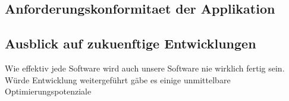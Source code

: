 \documentclass[../main.tex]{subfiles}
\begin{document}
\subsection{Anforderungskonformitaet der Applikation}
\subsection{Ausblick auf zukuenftige Entwicklungen}
Wie effektiv jede Software wird auch unsere Software nie wirklich fertig sein. 
Würde Entwicklung weitergeführt gäbe es einige unmittelbare Optimierungspotenziale
\end{document}
